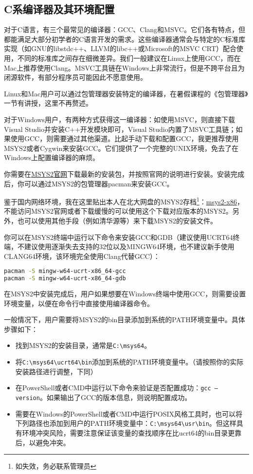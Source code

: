 \documentclass[../main.tex]{subfiles}
\begin{document}
\subsection{C系编译器及其环境配置}\label{sec:c-install}

对于C语言，有三个最常见的编译器：GCC、Clang和MSVC。它们各有特点，但都能满足大部分初学者的C语言开发的需求。这些编译器通常会与特定的C标准库实现（如GNU的libstdc++、LLVM的libc++或Microsoft的MSVC CRT）配合使用，不同的标准库之间存在细微差异。我们一般建议在Linux上使用GCC，而在Mac上推荐使用Clang。MSVC工具链在Windows上非常流行，但是不跨平台且为闭源软件，有部分程序员可能因此不愿意使用。

Linux和Mac用户可以通过包管理器安装特定的编译器，在暑假课程的《包管理器》一节有讲授，这里不再赘述。

对于Windows用户，有两种方式获得这一编译器：如使用MSVC，则直接下载Visual Studio并安装C++开发模块即可，Visual Studio内置了MSVC工具链；如果使用GCC，则需要通过其他渠道。比起手动下载和配置GCC，我更推荐使用MSYS2或者Cygwin来安装GCC。它们提供了一个完整的UNIX环境，免去了在Windows上配置编译器的麻烦。

你需要在\href{https://www.msys2.org/}{MSYS2官网}下载最新的安装包，并按照官网的说明进行安装。安装完成后，你可以通过MSYS2的包管理器pacman来安装GCC。

鉴于国内网络环境，我在这里贴出本人在北大网盘的MSYS2存档\footnote{如失效，务必联系管理员}：\href{https://disk.pku.edu.cn/link/AADF534C03FA714DC982607A17BEF8A178}{msys2-x86}，不能访问MSYS2官网或者下载缓慢的可以使用这个下载对应版本的MSYS2。另外，也可以使用其他手段（例如清华源等）来下载MSYS2的安装文件。

你可以在MSYS2终端中运行以下命令来安装GCC和GDB（建议使用UCRT64终端，不建议使用逐渐失去支持的32位以及MINGW64环境，也不建议新手使用CLANG64环境，该环境完全使用Clang代替GCC）：

\begin{lstlisting}[language=bash]
pacman -S mingw-w64-ucrt-x86_64-gcc
pacman -S mingw-w64-ucrt-x86_64-gdb
\end{lstlisting}

在MSYS2中安装完成后，用户如果想要在Windows终端中使用GCC，则需要设置环境变量，以便在命令行中直接使用编译器命令。

一般情况下，用户需要将MSYS2的bin目录添加到系统的PATH环境变量中。具体步骤如下：

\begin{itemize}
  \item 找到MSYS2的安装目录，通常是\texttt{C:\textbackslash msys64}。
  \item 将\texttt{C:\textbackslash msys64\textbackslash ucrt64\textbackslash bin}添加到系统的PATH环境变量中。（请按照你的实际安装路径进行调整，下同）
  \item 在PowerShell或者CMD中运行以下命令来验证是否配置成功：\texttt{gcc --version}。如果输出了GCC的版本信息，则说明配置成功。
  \item 需要在Windows的PowerShell或者CMD中运行POSIX风格工具时，也可以将下列路径也添加到用户的PATH环境变量中：\texttt{C:\textbackslash msys64\textbackslash usr\textbackslash bin}。但这样具有环境冲突风险，需要注意保证该变量的查找顺序在比ucrt64的bin目录更靠后，以避免冲突。
\end{itemize}
\end{document}
